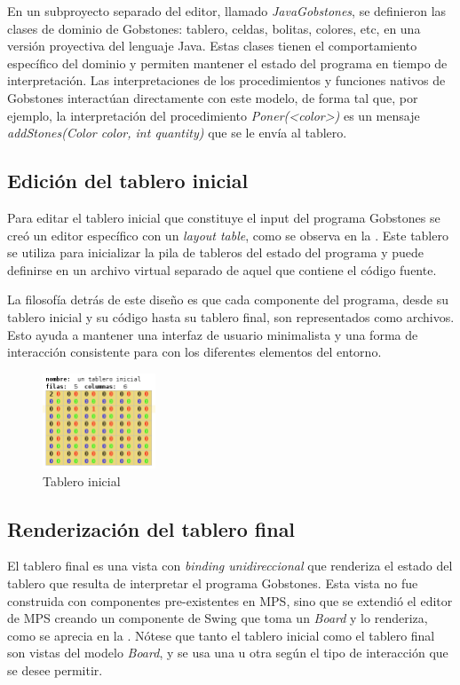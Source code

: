 En un subproyecto separado del editor, llamado \textit{JavaGobstones}, se definieron las clases de dominio de Gobstones: tablero, celdas, bolitas, colores, etc, en una versión proyectiva del lenguaje Java. Estas clases tienen el comportamiento específico del dominio y permiten mantener el estado del programa en tiempo de interpretación. Las interpretaciones de los procedimientos y funciones nativos de Gobstones interactúan directamente con este modelo, de forma tal que, por ejemplo, la interpretación del procedimiento \textit{Poner(<color>)} es un mensaje \textit{addStones(Color color, int quantity)} que se le envía al tablero.

\subsection{Edición del tablero inicial}

Para editar el tablero inicial que constituye el input del programa Gobstones se creó un editor específico con un \textit{layout table}, como se observa en la . Este tablero se utiliza para inicializar la pila de tableros del estado del programa y puede definirse en un archivo virtual separado de aquel que contiene el código fuente. 

La filosofía detrás de este diseño es que cada componente del programa, desde su tablero inicial y su código hasta su tablero final, son representados como archivos. Esto ayuda a mantener una interfaz de usuario minimalista y una forma de interacción consistente para con los diferentes elementos del entorno.

\begin{figure}[hb]
\centering
\includegraphics[width=0.3\textwidth]{assets/initial_board}
\caption{Tablero inicial}
\label{fig:initial_board}
\end{figure}


\subsection{Renderización del tablero final}

El tablero final es una vista con \textit{binding unidireccional} que renderiza el estado del tablero que resulta de interpretar el programa Gobstones. Esta vista no fue construida con componentes pre-existentes en MPS, sino que se extendió el editor de MPS creando un componente de Swing \cite{swing} que toma un \textit{Board} y lo renderiza, como se aprecia en la . Nótese que tanto el tablero inicial como el tablero final son vistas del modelo \textit{Board}, y se usa una u otra según el tipo de interacción que se desee permitir.


